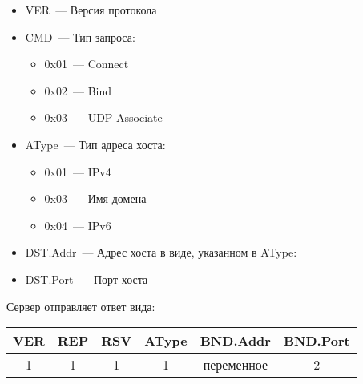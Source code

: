 \documentclass[a4paper,11pt]{article}
\begin{document}
\begin{itemize}

  \item VER~--- Версия протокола

  \item CMD~--- Тип запроса: 

  \begin{itemize}

    \item 0x01~--- Connect

    \item 0x02~--- Bind

    \item 0x03~--- UDP Associate

  \end{itemize}

  \item AType~--- Тип адреса хоста:

  \begin{itemize}

    \item 0x01~--- IPv4

    \item 0x03~--- Имя домена 

    \item 0x04~--- IPv6

  \end{itemize}

  \item DST.Addr~--- Адрес хоста в виде, указанном в AType:

  \item DST.Port~--- Порт хоста

\end{itemize}

Сервер отправляет ответ вида:

\begin{tabular}{|c|c|c|c|c|c|}  
  \hline  
  VER & REP & RSV & AType & BND.Addr & BND.Port \\
  \hline  
  1 & 1 & 1 & 1 & переменное & 2\\  
  \hline
\end{tabular}
\end{document}
